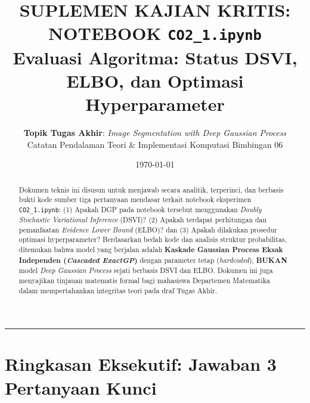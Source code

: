 \documentclass[11pt,a4paper]{article}
\title{
    \vspace{-1.2cm}
    \textbf{\Large SUPLEMEN KAJIAN KRITIS: NOTEBOOK \texttt{CO2\_1.ipynb}} \\[0.3em]
    \textbf{\large Evaluasi Algoritma: Status DSVI, ELBO, dan Optimasi Hyperparameter}
}
\author{
    \textbf{Topik Tugas Akhir}: \textit{Image Segmentation with Deep Gaussian Process} \\
    Catatan Pendalaman Teori \& Implementasi Komputasi Bimbingan 06
}
\date{\today}
\begin{document}
\maketitle
\vspace{-0.5cm}

\begin{abstract}
\noindent Dokumen teknis ini disusun untuk menjawab secara analitik, terperinci, dan berbasis bukti kode sumber tiga pertanyaan mendasar terkait notebook eksperimen \texttt{CO2\_1.ipynb}: (1) Apakah DGP pada notebook tersebut menggunakan \textit{Doubly Stochastic Variational Inference} (DSVI)? (2) Apakah terdapat perhitungan dan pemanfaatan \textit{Evidence Lower Bound} (ELBO)? dan (3) Apakah dilakukan prosedur optimasi hyperparameter? Berdasarkan bedah kode dan analisis struktur probabilitas, ditemukan bahwa model yang berjalan adalah \textbf{Kaskade Gaussian Process Eksak Independen (\textit{Cascaded ExactGP})} dengan parameter tetap (\textit{hardcoded}), \textbf{BUKAN} model \textit{Deep Gaussian Process} sejati berbasis DSVI dan ELBO. Dokumen ini juga menyajikan tinjauan matematis formal bagi mahasiswa Departemen Matematika dalam mempertahankan integritas teori pada draf Tugas Akhir.
\end{abstract}

\vspace{0.1cm}
\hrule
\vspace{0.3cm}

\section{Ringkasan Eksekutif: Jawaban 3 Pertanyaan Kunci}
\label{sec:ringkasan}
\end{document}

